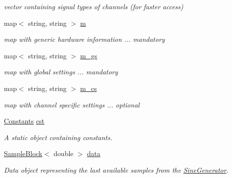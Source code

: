 \begin{DoxyCompactItemize}
\begin{DoxyCompactList}\small\item\em vector containing signal types of channels (for faster access) \item\end{DoxyCompactList}\item 
\hypertarget{class_h_w_thread_a114c37f5ef0ab7ae5b4d4342ec051eac}{
map$<$ string, string $>$ \hyperlink{class_h_w_thread_a114c37f5ef0ab7ae5b4d4342ec051eac}{m}}
\label{class_h_w_thread_a114c37f5ef0ab7ae5b4d4342ec051eac}

\begin{DoxyCompactList}\small\item\em map with generic hardware information ... mandatory \item\end{DoxyCompactList}\item 
\hypertarget{class_h_w_thread_a51a8539e21aeb8f54dfebb85ff669ca4}{
map$<$ string, string $>$ \hyperlink{class_h_w_thread_a51a8539e21aeb8f54dfebb85ff669ca4}{m\_\-gs}}
\label{class_h_w_thread_a51a8539e21aeb8f54dfebb85ff669ca4}

\begin{DoxyCompactList}\small\item\em map with global settings ... mandatory \item\end{DoxyCompactList}\item 
\hypertarget{class_h_w_thread_a9ae5abead395b06dfd352c816c8e56dd}{
map$<$ string, string $>$ \hyperlink{class_h_w_thread_a9ae5abead395b06dfd352c816c8e56dd}{m\_\-cs}}
\label{class_h_w_thread_a9ae5abead395b06dfd352c816c8e56dd}

\begin{DoxyCompactList}\small\item\em map with channel specific settings ... optional \item\end{DoxyCompactList}\item 
\hypertarget{class_h_w_thread_ad57accff1aa3bd9f1fe2c291d0a7b1db}{
\hyperlink{class_constants}{Constants} \hyperlink{class_h_w_thread_ad57accff1aa3bd9f1fe2c291d0a7b1db}{cst}}
\label{class_h_w_thread_ad57accff1aa3bd9f1fe2c291d0a7b1db}

\begin{DoxyCompactList}\small\item\em A static object containing constants. \item\end{DoxyCompactList}\item 
\hyperlink{class_sample_block}{SampleBlock}$<$ double $>$ \hyperlink{class_h_w_thread_a64aa44932b8914a5623aa2f1efd4e149}{data}
\begin{DoxyCompactList}\small\item\em Data object representing the last available samples from the \hyperlink{class_sine_generator}{SineGenerator}. \item\end{DoxyCompactList}\end{DoxyCompactItemize}


